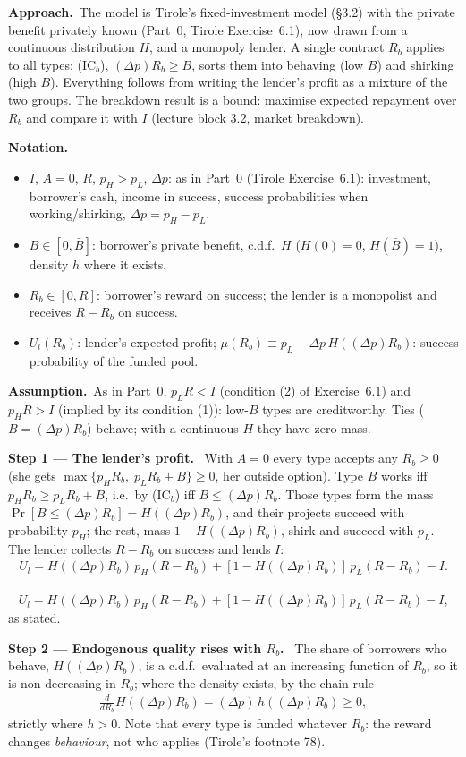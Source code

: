 \documentclass[11pt,a4paper]{article}
\newcommand{\notation}{\par\noindent\textbf{Notation.}}
\newcommand{\step}[2]{\par\medskip\noindent\textbf{Step #1 --- #2.}~}
\newcommand{\assume}{\par\smallskip\noindent\textbf{Assumption.}~}
\newcommand{\approach}{\par\smallskip\noindent\textbf{Approach.}~}
\newcommand{\answer}[1]{\par\smallskip\noindent\fbox{\textbf{Answer #1.}}~}
\begin{document}
\approach The model is Tirole's fixed-investment model (\S3.2) with the private benefit privately known (Part~0, Tirole Exercise~6.1), now drawn from a continuous distribution $H$, and a monopoly lender. A single contract $R_b$ applies to all types; (IC$_b$), $(\Delta p)R_b\ge B$, sorts them into behaving (low $B$) and shirking (high $B$). Everything follows from writing the lender's profit as a mixture of the two groups. The breakdown result is a bound: maximise expected repayment over $R_b$ and compare it with $I$ (lecture block 3.2, market breakdown).

\notation
\begin{itemize}
  \item $I$, $A=0$, $R$, $p_H>p_L$, $\Delta p$: as in Part~0 (Tirole Exercise~6.1): investment, borrower's cash, income in success, success probabilities when working/shirking, $\Delta p=p_H-p_L$.
  \item $B\in[0,\bar B]$: borrower's private benefit, c.d.f.\ $H$ ($H(0)=0$, $H(\bar B)=1$), density $h$ where it exists.
  \item $R_b\in[0,R]$: borrower's reward on success; the lender is a monopolist and receives $R-R_b$ on success.
  \item $U_l(R_b)$: lender's expected profit; $\mu(R_b)\equiv p_L+\Delta p\,H((\Delta p)R_b)$: success probability of the funded pool.
\end{itemize}

\assume As in Part~0, $p_LR<I$ (condition (2) of Exercise~6.1) and $p_HR>I$ (implied by its condition (1)): low-$B$ types are creditworthy. Ties ($B=(\Delta p)R_b$) behave; with a continuous $H$ they have zero mass.

\step{1}{The lender's profit} With $A=0$ every type accepts any $R_b\ge0$ (she gets $\max\{p_HR_b,\;p_LR_b+B\}\ge0$, her outside option). Type $B$ works iff $p_HR_b\ge p_LR_b+B$, i.e.\ by (IC$_b$) iff $B\le(\Delta p)R_b$. Those types form the mass $\Pr[B\le(\Delta p)R_b]=H((\Delta p)R_b)$, and their projects succeed with probability $p_H$; the rest, mass $1-H((\Delta p)R_b)$, shirk and succeed with $p_L$. The lender collects $R-R_b$ on success and lends $I$:
\begin{align}
  U_l = H((\Delta p)R_b)\,p_H(R-R_b) + [1-H((\Delta p)R_b)]\,p_L(R-R_b) - I. \label{t3e8-Ul}
\end{align}

\answer{(0)} $U_l=H((\Delta p)R_b)\,p_H(R-R_b)+[1-H((\Delta p)R_b)]\,p_L(R-R_b)-I$, as stated.

\step{2}{Endogenous quality rises with $R_b$} The share of borrowers who behave, $H((\Delta p)R_b)$, is a c.d.f.\ evaluated at an increasing function of $R_b$, so it is non-decreasing in $R_b$; where the density exists, by the chain rule
\begin{align}
  \frac{d}{dR_b}H((\Delta p)R_b) = (\Delta p)\,h((\Delta p)R_b) \ge 0, \nonumber
\end{align}
strictly where $h>0$. Note that every type is funded whatever $R_b$: the reward changes \emph{behaviour}, not who applies (Tirole's footnote 78).
\end{document}
